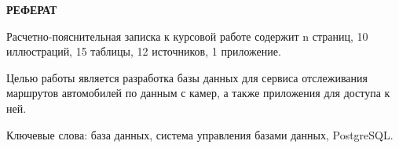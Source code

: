 \begin{center}
    \textbf{РЕФЕРАТ}
\end{center}
\setcounter{page}{3}

Расчетно-пояснительная записка к курсовой работе содержит n страниц, 10 иллюстраций, 15 таблицы, 12 источников, 1 приложение.

Целью работы является разработка базы данных для сервиса отслеживания маршрутов автомобилей по данным с камер, а также приложения для доступа к ней.

Ключевые слова: база данных, система управления базами данных, PostgreSQL.
